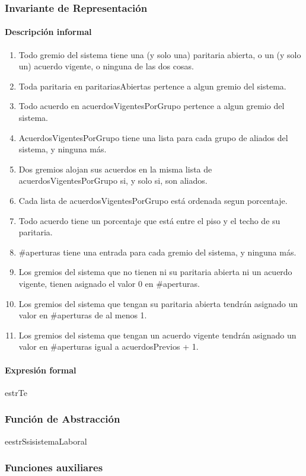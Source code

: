 \subsubsection{Invariante de Representaci\'on}

\paragraph{Descripción informal}
\begin{enumerate}

	\item Todo gremio del sistema tiene una (y solo una) paritaria abierta, o un (y solo un) acuerdo vigente, o ninguna de las dos cosas.
	\item Toda paritaria en paritariasAbiertas pertence a algun gremio del sistema.
	\item Todo acuerdo en acuerdosVigentesPorGrupo pertence a algun gremio del sistema.
	\item AcuerdosVigentesPorGrupo tiene una lista para cada grupo de aliados del sistema, y ninguna más.
	\item Dos gremios alojan sus acuerdos en la misma lista de acuerdosVigentesPorGrupo si, y solo si, son aliados.
	\item Cada lista de acuerdosVigentesPorGrupo está ordenada segun porcentaje.
	\item Todo acuerdo tiene un porcentaje que está entre el piso y el techo de su paritaria.
	\item \#aperturas tiene una entrada para cada gremio del sistema, y ninguna más.
	\item Los gremios del sistema que no tienen ni su paritaria abierta ni un acuerdo vigente, tienen asignado el valor 0 en \#aperturas.
	\item Los gremios del sistema que tengan su paritaria abierta tendrán asignado un valor en \#aperturas de al menos 1.
	\item Los gremios del sistema que tengan un acuerdo vigente tendrán asignado un valor en \#aperturas igual a acuerdosPrevios + 1.

\end{enumerate}

\paragraph{Expresión formal \\}
\begin{RepFormal}{estrT}{e}
\end{RepFormal}

\subsubsection{Funci\'on de Abstracci\'on}

\begin{FunAbsDescriptiva}{e}{estrS}{si}{sistemaLaboral}


\end{FunAbsDescriptiva}

\subsubsection{Funciones auxiliares}
